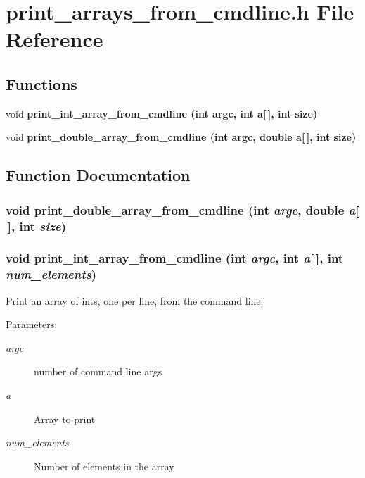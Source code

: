 \section{print\_\-arrays\_\-from\_\-cmdline.h File Reference}
\label{print__arrays__from__cmdline_8h}
\subsection*{Functions}
\begin{CompactItemize}
\item 
void \bf{print\_\-int\_\-array\_\-from\_\-cmdline} (int argc, int a[$\,$], int size)
\item 
void \bf{print\_\-double\_\-array\_\-from\_\-cmdline} (int argc, double a[$\,$], int size)
\end{CompactItemize}


\subsection{Function Documentation}
\subsubsection{\setlength{\rightskip}{0pt plus 5cm}void print\_\-double\_\-array\_\-from\_\-cmdline (int {\em argc}, double {\em a}[$\,$], int {\em size})}\label{print__arrays__from__cmdline_8h_479effbf0e027b55b4de400d292bc54c}


\subsubsection{\setlength{\rightskip}{0pt plus 5cm}void print\_\-int\_\-array\_\-from\_\-cmdline (int {\em argc}, int {\em a}[$\,$], int {\em num\_\-elements})}\label{print__arrays__from__cmdline_8h_5882b5336f5b2403e7f64f84318bfbc0}


Print an array of ints, one per line, from the command line. \begin{Desc}
\item[Parameters:]
\begin{description}
\item[{\em argc}]number of command line args \item[{\em a}]Array to print \item[{\em num\_\-elements}]Number of elements in the array \end{description}
\end{Desc}
